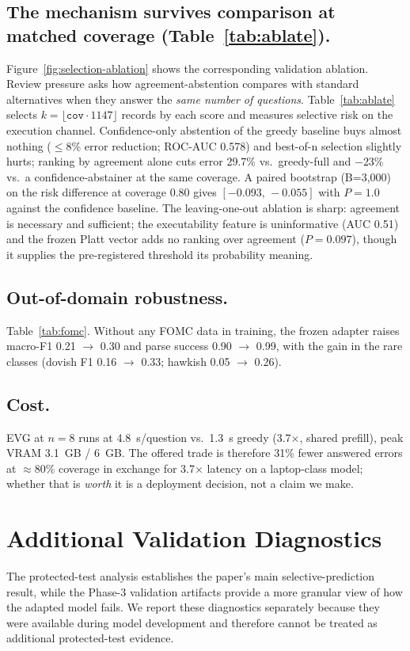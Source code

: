 \documentclass[conference]{IEEEtran}
\begin{document}
\subsection{The mechanism survives comparison at matched coverage (Table~\ref{tab:ablate}).}
Figure~\ref{fig:selection-ablation} shows the corresponding validation ablation. Review pressure asks how agreement-abstention compares with standard alternatives when
they answer the \emph{same number of questions}. Table~\ref{tab:ablate} selects $k =
\lfloor \mathtt{cov}\cdot 1147\rfloor$ records by each score and measures selective risk on
the execution channel. Confidence-only abstention of the greedy baseline buys almost nothing
($\le$8\% error reduction; ROC-AUC 0.578) and best-of-n selection slightly hurts; ranking by
agreement alone cuts error 29.7\% vs.\ greedy-full and $-$23\% vs.\ a confidence-abstainer at
the same coverage. A paired bootstrap (B=3{,}000) on the risk difference at coverage 0.80
gives $[-0.093,\,-0.055]$ with $P=1.0$ against the confidence baseline. The leaving-one-out
ablation is sharp: agreement is necessary and sufficient; the executability feature is
uninformative (AUC 0.51) and the frozen Platt vector adds no ranking over agreement
($P{=}0.097$), though it supplies the pre-registered threshold its probability meaning.

\subsection{Out-of-domain robustness.}
Table~\ref{tab:fomc}. Without any FOMC data in training, the frozen adapter raises macro-F1
0.21 $\rightarrow$ 0.30 and parse success 0.90 $\rightarrow$ 0.99, with the gain in the
rare classes (dovish F1 0.16 $\rightarrow$ 0.33; hawkish 0.05 $\rightarrow$ 0.26).

\subsection{Cost.} EVG at $n=8$ runs at 4.8~s/question vs.\ 1.3~s greedy (3.7$\times$,
shared prefill), peak VRAM 3.1~GB / 6~GB. The offered trade is therefore 31\% fewer
answered errors at $\approx$80\% coverage in exchange for 3.7$\times$ latency on a laptop-class
model; whether that is \emph{worth} it is a deployment decision, not a claim we make.

\section{Additional Validation Diagnostics}
\label{sec:diagnostics}
The protected-test analysis establishes the paper's main selective-prediction result, while
the Phase-3 validation artifacts provide a more granular view of how the adapted model
fails. We report these diagnostics separately because they were available during model
development and therefore cannot be treated as additional protected-test evidence.
\end{document}
